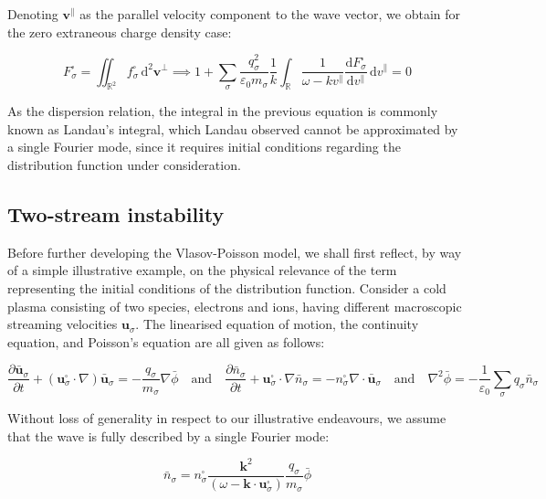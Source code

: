 Denoting $\mathbf{v}^\parallel$ as the parallel velocity component to the wave vector, we obtain for the zero extraneous charge density case:

\begin{equation}
    F_\sigma^\square=\iint_{\mathbb{R}^2}f_\sigma^\square\,\mathrm{d}^2\mathbf{v}^\perp\implies1+\sum_\sigma\frac{q_\sigma^2}{\varepsilon_0 m_\sigma}\frac{1}{k}\int_{\mathbb{R}}\frac{1}{\omega-kv^\parallel}\frac{\mathrm{d}F_\sigma^\square}{\mathrm{d}v^\parallel}\,\mathrm{d}v^\parallel=0
\end{equation}

As the dispersion relation, the integral in the previous equation is commonly known as Landau's integral, which Landau observed cannot be approximated by a single Fourier mode, since it requires initial conditions regarding the distribution function under consideration.

\subsection{Two-stream instability}

\label{instability}

Before further developing the Vlasov-Poisson model, we shall first reflect, by way of a simple illustrative example, on the physical relevance of the term representing the initial conditions of the distribution function. Consider a cold plasma consisting of two species, electrons and ions, having different macroscopic streaming velocities $\mathbf{u}_\sigma$. The linearised equation of motion, the continuity equation, and Poisson's equation are all given as follows:

\begin{equation}
    \frac{\partial\bar{\mathbf{u}}_\sigma}{\partial t}+(\mathbf{u}_\sigma^\square\cdot\nabla)\bar{\mathbf{u}}_\sigma=-\frac{q_\sigma}{m_\sigma}\nabla\bar{\phi}\quad\text{and}\quad\frac{\partial\bar{n}_\sigma}{\partial t}+\mathbf{u}_\sigma^\square\cdot\nabla\bar{n}_\sigma=-n_\sigma^\square\nabla\cdot\bar{\mathbf{u}}_\sigma\quad\text{and}\quad\nabla^2\bar{\phi}=-\frac{1}{\varepsilon_0}\sum_{\sigma}q_\sigma\bar{n}_\sigma
\end{equation}

Without loss of generality in respect to our illustrative endeavours, we assume that the wave is fully described by a single Fourier mode:

\begin{equation}
    \bar{n}_\sigma=n_\sigma^\square\frac{\mathbf{k}^2}{(\omega-\mathbf{k}\cdot\mathbf{u}_\sigma^\square)}\frac{q_\sigma}{m_\sigma}\bar{\phi}
\end{equation}


